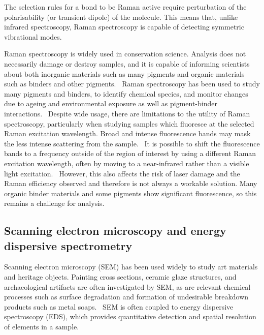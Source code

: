 The selection rules for a bond to be Raman active require perturbation of the polarisability (or transient dipole) of the molecule. This means that, unlike infrared spectroscopy, Raman spectroscopy is capable of detecting symmetric vibrational modes.~\autocite{2018RS,inphotonics}

Raman spectroscopy is widely used in conservation science. Analysis does not necessarily damage or destroy samples, and it is capable of informing scientists about both inorganic materials such as many pigments and organic materials such as binders and other pigments.~\autocite{conti_2016} Raman spectroscopy has been used to study many pigments and binders, to identify chemical species, and monitor changes due to ageing and environmental exposure as well as pigment-binder interactions.~\autocite{conti_2016,matousek_tissue,tomasini_raman,pallipurath2014,pallipurath2013,lazzari,vandenabeele} Despite wide usage, there are limitations to the utility of Raman spectroscopy, particularly when studying samples which fluoresce at the selected Raman excitation wavelength. Broad and intense fluorescence bands may mask the less intense scattering from the sample.~\autocite{Wei} It is possible to shift the fluorescence bands to a frequency outside of the region of interest by using a different Raman excitation wavelength, often by moving to a near-infrared rather than a visible light excitation.~\autocite{Kaszowska,Mancini} However, this also affects the risk of laser damage and the Raman efficiency observed and therefore is not always a workable solution. Many organic binder materials and some pigments show significant fluorescence, so this remains a challenge for analysis. 


\subsection[Scanning electron microscopy and energy dispersive spectrometry]{Scanning electron microscopy and energy dispersive spectrometry}
\label{subsection1.2.2}

Scanning electron microscopy (SEM) has been used widely to study art materials and heritage objects. Painting cross sections, ceramic glaze structures, and archaeological artifacts are often investigated by SEM, as are relevant chemical processes such as surface degradation and formation of undesirable breakdown products such as metal soaps.~\autocite{Lazzara, Hermans, Pradell, Schreiner} SEM is often coupled to energy dispersive spectroscopy (EDS), which provides quantitative detection and spatial resolution of elements in a sample.

